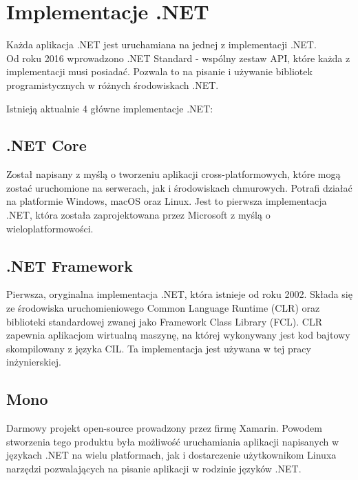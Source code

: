 
\section{Implementacje .NET}

Każda aplikacja .NET jest uruchamiana na jednej z implementacji .NET. \\
Od roku 2016 wprowadzono .NET Standard - wspólny zestaw API, które każda z implementacji musi posiadać. Pozwala to na pisanie i używanie bibliotek programistycznych w różnych środowiskach .NET.

Istnieją aktualnie 4 główne implementacje .NET:

\subsection{.NET Core}
Został napisany z myślą o tworzeniu aplikacji cross-platformowych, które mogą zostać uruchomione na serwerach, jak i środowiskach chmurowych. Potrafi działać na platformie Windows, macOS oraz Linux. Jest to pierwsza implementacja .NET, która została zaprojektowana przez Microsoft z myślą o wieloplatformowości.

\subsection{.NET Framework}
Pierwsza, oryginalna implementacja .NET, która istnieje od roku 2002. Składa się ze środowiska uruchomieniowego Common Language Runtime (CLR) oraz biblioteki standardowej zwanej jako Framework Class Library (FCL). CLR zapewnia aplikacjom wirtualną maszynę, na której wykonywany jest kod bajtowy skompilowany z języka CIL. Ta implementacja jest używana w tej pracy inżynierskiej.

\subsection{Mono}
Darmowy projekt open-source prowadzony przez firmę Xamarin. Powodem stworzenia tego produktu była możliwość uruchamiania aplikacji napisanych w językach .NET na wielu platformach, jak i dostarczenie użytkownikom Linuxa narzędzi pozwalających na pisanie aplikacji w rodzinie języków .NET.
